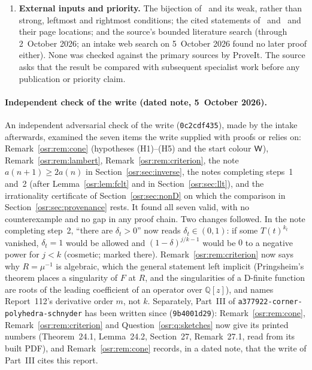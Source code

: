 \documentclass[11pt,letterpaper]{article}
\newcommand{\Q}{\mathbb Q}\newcommand{\R}{\mathbb R}\newcommand{\Z}{\mathbb Z}
\numberwithin{equation}{section}
\begin{document}
\begin{enumerate}
 Lemma~\ref{osr:lem:bridge} and at the end of the transfer subsection
 describe. The intake judged both correct in outline; Report~112's
 Theorem~2.1, Theorem~24.1 of \nolinkurl{a377922-corner-polyhedra-schnyder}
 (Remark~\ref{osr:rem:cone}), proves the same exponent for a
 class containing this chain, with its own versions of these steps (its
 Lemma~2.2 on exact-time interior bridges, Lemma~24.2 there, and its
 crossing bounds), which the
 intake did not check line by line either. Steps~1 and~2 (after
 Lemma~\ref{osr:lem:fclt} and in Section~\ref{osr:sec:llt}) are completed by
 the write.
\item\label{osr:q:external} \textbf{External inputs and priority.} The
 bijection of~\cite{rect} and its weak, rather than strong, leftmost and
 rightmost conditions; the cited statements of~\cite{whitt} and~\cite{FR}
 and their page locations; and the source's bounded literature search
 (through 2~October 2026; an intake web search on 5~October 2026 found no
 later proof either). None was checked against the primary sources by
 ProveIt. The source asks that the result be compared with subsequent
 specialist work before any publication or priority claim.
\end{enumerate}

\paragraph{Independent check of the write (dated note, 5~October 2026).}
An independent adversarial check of the write (\nolinkurl{0c2cdf435}), made
by the intake afterwards, examined the seven items the write supplied with
proofs or relies on: Remark~\ref{osr:rem:cone} (hypotheses (H1)--(H5) and the
start colour $\mathsf W$), Remark~\ref{osr:rem:lambert}, Remark~\ref{osr:rem:criterion},
the note $a(n+1)\ge2a(n)$ in Section~\ref{osr:sec:inverse}, the notes
completing steps~1 and~2 (after Lemma~\ref{osr:lem:fclt} and in
Section~\ref{osr:sec:llt}), and the irrationality certificate of
Section~\ref{osr:sec:nonD} on which the comparison in
Section~\ref{osr:sec:provenance} rests. It found all seven valid, with no
counterexample and no gap in any proof chain. Two changes followed. In the
note completing step~2, ``there are $\delta_t>0$'' now reads
$\delta_t\in(0,1)$: if some $T(t)^{k_t}$ vanished, $\delta_t=1$ would be
allowed and $(1-\delta)^{j/k-1}$ would be $0$ to a negative power for $j<k$
(cosmetic; marked there). Remark~\ref{osr:rem:criterion} now says why
$R=\mu^{-1}$ is algebraic, which the general statement left implicit
(Pringsheim's theorem places a singularity of $F$ at $R$, and the
singularities of a D-finite function are roots of the leading coefficient
of an operator over $\Q[z]$), and names Report~112's derivative order $m$,
not $k$. Separately, Part~III of \nolinkurl{a377922-corner-polyhedra-schnyder}
has been written since (\nolinkurl{9b4001d29}): Remark~\ref{osr:rem:cone},
Remark~\ref{osr:rem:criterion} and Question~\ref{osr:q:sketches} now give its
printed numbers (Theorem~24.1, Lemma~24.2, Section~27, Remark~27.1, read
from its built PDF), and Remark~\ref{osr:rem:cone} records, in a dated note,
that the write of Part~III cites this report.
\end{document}
